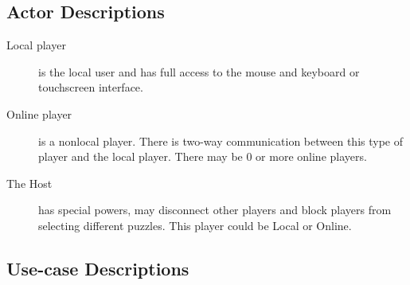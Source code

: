\documentclass[12pt]{article}
\begin{document}
\subsection{Actor Descriptions}
    \begin{description}
        \item[Local player] is the local user and has full
            access to the mouse and keyboard or touchscreen interface.
        \item[Online player] is a nonlocal player. There is two-way
            communication between this type of player and the local player.
            There may be 0 or more online players.
        \item[The Host] has special powers, may disconnect other players and
            block players from selecting different puzzles. This player could
            be Local or Online.
    \end{description}

\subsection{Use-case Descriptions}
\end{document}
